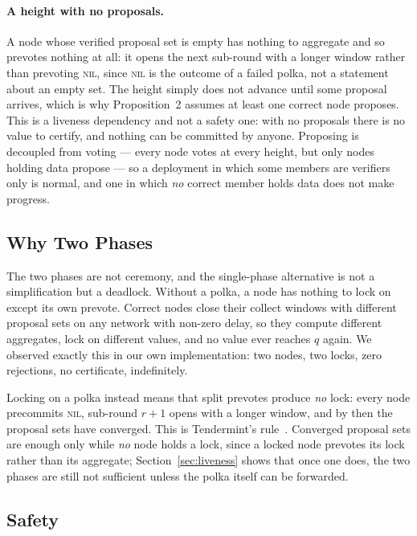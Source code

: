 \documentclass{llncs}
\begin{document}
\paragraph{A height with no proposals.}
A node whose verified proposal set is empty has nothing to aggregate and so
prevotes nothing at all: it opens the next sub-round with a longer window rather
than prevoting \textsc{nil}, since \textsc{nil} is the outcome of a failed
polka, not a statement about an empty set. The height simply does not advance
until some proposal arrives, which is why Proposition~2 assumes at least one
correct node proposes. This is a liveness dependency and not a safety one: with
no proposals there is no value to certify, and nothing can be committed by
anyone. Proposing is decoupled from voting --- every node votes at every height,
but only nodes holding data propose --- so a deployment in which some members
are verifiers only is normal, and one in which \emph{no} correct member holds
data does not make progress.

\subsection{Why Two Phases}

The two phases are not ceremony, and the single-phase alternative is not a
simplification but a deadlock. Without a polka, a node has nothing to lock on
except its own prevote. Correct nodes close their collect windows with different
proposal sets on any network with non-zero delay, so they compute different
aggregates, lock on different values, and no value ever reaches $q$ again. We
observed exactly this in our own implementation: two nodes, two locks, zero
rejections, no certificate, indefinitely.

Locking on a polka instead means that split prevotes produce \emph{no} lock:
every node precommits \textsc{nil}, sub-round $r+1$ opens with a longer window,
and by then the proposal sets have converged. This is Tendermint's
rule~\cite{buchman2018tendermint}. Converged proposal sets are enough only while
\emph{no} node holds a lock, since a locked node prevotes its lock rather than
its aggregate; Section~\ref{sec:liveness} shows that once one does, the two
phases are still not sufficient unless the polka itself can be forwarded.

\subsection{Safety}
\label{sec:safety}
\end{document}
